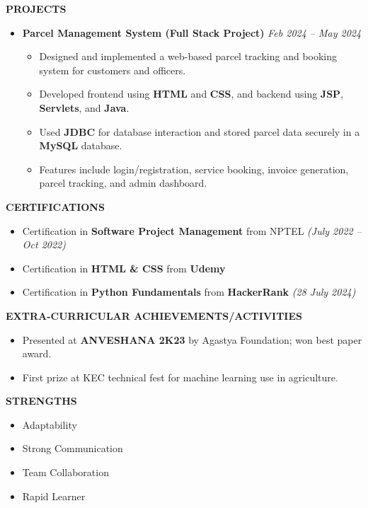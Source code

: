 \documentclass[a4paper,10pt]{article}
\newcommand{\resheading}[1]{{\small \colorbox{mygrey}{\begin{minipage}{0.975\textwidth}{\textbf{#1 \vphantom{p\^{E}}}}\end{minipage}}}}
\begin{document}
\resheading{\textbf{PROJECTS} }
\begin{itemize}
 \vspace{-0.5mm}
\item {\bf Parcel Management System (Full Stack Project)} 
\textit{\hfill {Feb 2024 – May 2024}}
\begin{itemize}
\vspace{-2mm}
\item Designed and implemented a web-based parcel tracking and booking system for customers and officers.
\item Developed frontend using \textbf{HTML} and \textbf{CSS}, and backend using \textbf{JSP}, \textbf{Servlets}, and \textbf{Java}.
\item Used \textbf{JDBC} for database interaction and stored parcel data securely in a \textbf{MySQL} database.
\item Features include login/registration, service booking, invoice generation, parcel tracking, and admin dashboard.
\vspace{-2mm}
\end{itemize}
\end{itemize}

\resheading{\textbf{CERTIFICATIONS} }
\begin{itemize}
\vspace{-0.5mm}
\item Certification in \textbf{Software Project Management} from NPTEL \textit{(July 2022 – Oct 2022)}
\vspace{-1.5mm}
\item Certification in \textbf{HTML \& CSS} from \textbf{Udemy}
\vspace{-1.5mm}
\item Certification in \textbf{Python Fundamentals} from \textbf{HackerRank} \textit{(28 July 2024)}
\end{itemize}

\resheading{\textbf{EXTRA-CURRICULAR ACHIEVEMENTS/ACTIVITIES} }
\begin{itemize}
\vspace{-0.5mm}
\item Presented at \textbf{ANVESHANA 2K23} by Agastya Foundation; won best paper award.
\vspace{-1.5mm}
\item First prize at KEC technical fest for machine learning use in agriculture.
\end{itemize}

\resheading{\textbf{STRENGTHS} }
\begin{itemize}
\vspace{-0.5mm}
\item Adaptability
\vspace{-1mm}
\item Strong Communication
\vspace{-1mm}
\item Team Collaboration
\vspace{-1mm}
\item Rapid Learner
\end{itemize}
\end{document}
